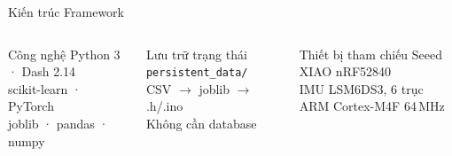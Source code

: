 \documentclass[aspectratio=169,12pt]{beamer}
\begin{document}
\begin{frame}{Kiến trúc Framework}
  \vspace{4pt}
  \begin{columns}[T]
      \begin{block}{\small Công nghệ}
        \scriptsize
        Python 3 · Dash 2.14\\
        scikit-learn · PyTorch\\
        joblib · pandas · numpy
      \end{block}
      \begin{block}{\small Lưu trữ trạng thái}
        \scriptsize
        \texttt{persistent\_data/}\\
        CSV $\to$ joblib $\to$ .h/.ino\\
        Không cần database
      \end{block}
      \begin{block}{\small Thiết bị tham chiếu}
        \scriptsize
        Seeed XIAO nRF52840\\
        IMU LSM6DS3, 6 trục\\
        ARM Cortex-M4F 64\,MHz
      \end{block}
  \end{columns}
\end{frame}
\end{document}
